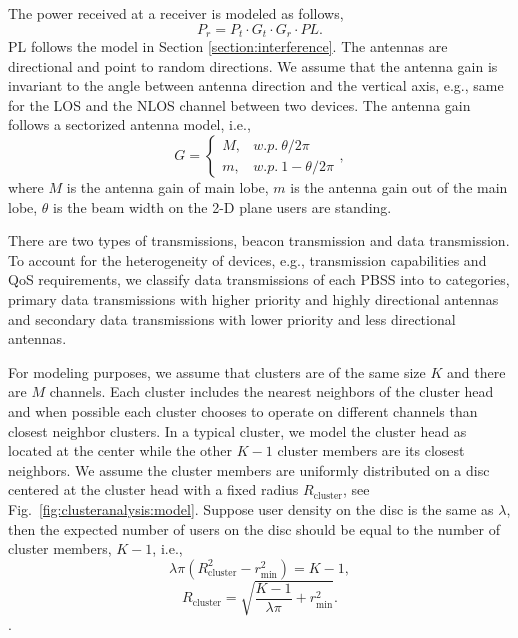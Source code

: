 \documentclass[10pt, conference, letterpaper]{IEEEtran}
\begin{document}
The power received at a receiver is modeled as follows,
\begin{equation*}
P_r = P_t\cdot G_t\cdot G_r \cdot PL.
\end{equation*}
PL follows the model in Section \ref{section:interference}. The antennas are directional and point to random directions. 
We assume that the antenna gain is invariant to the angle between antenna direction and the vertical axis, e.g., same for the LOS and the NLOS channel between two devices. 
The antenna gain follows a sectorized antenna model, i.e., 
\begin{equation*}
G = 
\begin{cases}
M, & w.p. ~ \theta/2\pi \\
m, & w.p. ~ 1-\theta/2\pi
\end{cases},
\end{equation*}
where $M$ is the antenna gain of main lobe, $m$ is the antenna gain out of the main lobe, $\theta$ is the beam width on the 2-D plane users are standing. 


There are two types of transmissions, beacon transmission and data transmission. To account for the heterogeneity of devices, e.g., transmission capabilities and QoS requirements, we classify data transmissions of each PBSS into to categories, primary data transmissions with higher priority and  highly directional antennas and secondary data transmissions with lower priority and less directional antennas. 


For modeling purposes, we assume that clusters are of the same size $K$ and there are $M$ channels. Each cluster includes the nearest neighbors of the cluster head and when possible each cluster chooses to operate on different channels than closest neighbor clusters.
In a typical cluster, we model the cluster head as located at the center while the other $K-1$ cluster members are its closest neighbors.
We assume the cluster members are uniformly distributed on a disc centered at the cluster head with a fixed radius $R_{\mathrm{cluster}}$, see Fig.~\ref{fig:clusteranalysis:model}. 
Suppose user density on the disc is the same as $\lambda$, then the expected number of users on the disc should be equal to the number of cluster members, $K - 1$, i.e., 
\begin{equation*}
\lambda \pi (R_{\mathrm{cluster}}^2 - r_{\min}^2) = K - 1,
\end{equation*}
\begin{equation*}
R_{\mathrm{cluster}} = \sqrt{\frac{K - 1}{\lambda\pi}+r_{\min}^2}.
\end{equation*}.
\end{document}
